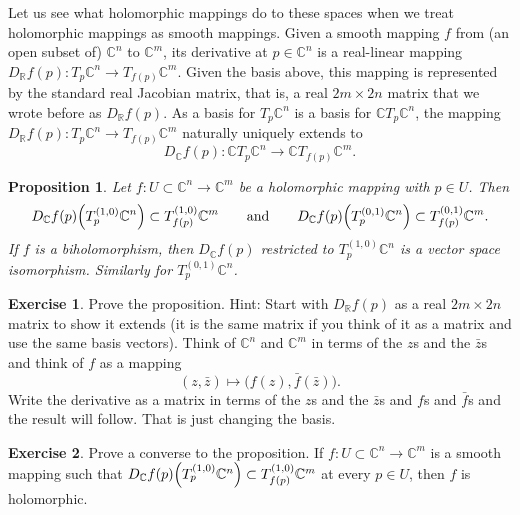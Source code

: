 \documentclass[12pt,openany]{book}
\newcommand{\C}{{\mathbb{C}}}
\newcommand{\R}{{\mathbb{R}}}
\theoremstyle{plain}
\newtheorem{prop}[thm]{Proposition}
\theoremstyle{remark}
\theoremstyle{definition}
\newenvironment{exbox}{%
    \def\FrameCommand{\vrule width 1pt \relax\hspace{10pt}}%
    \MakeFramed{\advance\hsize-\width\FrameRestore}%
}{%
    \endMakeFramed
}
\theoremstyle{exercise}
\newtheorem{exercise}{Exercise}[section]
\theoremstyle{example}
\begin{document}
Let us see what holomorphic mappings do to these spaces when we treat
holomorphic mappings as smooth mappings.
Given a smooth
mapping $f$ from (an open subset of) $\C^n$ to $\C^m$, its derivative at $p \in \C^n$
is a real-linear mapping $D_\R f(p) \colon T_p\C^n \to T_{f(p)} \C^m$.
Given the basis above, this mapping is represented by
the standard real Jacobian matrix, that is, a real $2m \times 2n$ matrix
that we wrote before as $D_\R f(p)$.
As a basis for $T_p\C^n$ is a basis for $\C T_p \C^n$, the mapping
$D_\R f(p) \colon T_p\C^n \to T_{f(p)} \C^m$ naturally uniquely
extends to
%
\begin{equation*}
D_\C f(p) \colon \C T_p\C^n \to \C T_{f(p)} \C^m .
\end{equation*}

\begin{prop} \label{prop:holvectmap}
Let $f \colon U \subset \C^n \to \C^m$ be a holomorphic mapping with
$p \in U$.
Then
\begin{equation*}
D_\C f(p)\Bigl(T_p^{(1,0)} \C^n\Bigr) \subset T_{f(p)}^{(1,0)} \C^m
\qquad \text{and} \qquad
D_\C f(p)\Bigl(T_p^{(0,1)} \C^n\Bigr) \subset T_{f(p)}^{(0,1)} \C^m .
\end{equation*}
If $f$ is a biholomorphism, then $D_\C f(p)$ restricted to $T_p^{(1,0)} \C^n$
is a vector space isomorphism.  Similarly for $T_p^{(0,1)} \C^n$.
\end{prop}

\begin{exbox}
\begin{exercise}
Prove the proposition.
Hint: Start with $D_\R f(p)$ as a real $2m \times 2n$ matrix to show it
extends (it is the same matrix if you think of it as a matrix
and use the same basis vectors).
Think of $\C^n$ and $\C^m$ in terms of the $z$s and the
$\bar{z}$s and think of $f$ as a mapping
\begin{equation*}
(z,\bar{z}) \mapsto \bigl( f(z) , \bar{f}(\bar{z}) \bigr) .
\end{equation*}
Write the derivative as a matrix in terms of the $z$s and the $\bar{z}$s
and $f$s and $\bar{f}$s and the result will follow.  That is just changing
the basis.
\end{exercise}

\begin{exercise}
Prove a converse to the proposition.  If $f \colon U \subset \C^n \to \C^m$
is a smooth mapping such that
$D_\C f(p)\Bigl(T_p^{(1,0)} \C^n\Bigr) \subset T_{f(p)}^{(1,0)} \C^m$
at every $p \in U$, then $f$ is holomorphic.
\end{exercise}
\end{exbox}
\end{document}
